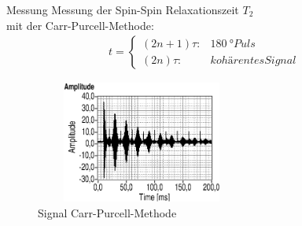\begin{frame}{Messung}
Messung der Spin-Spin Relaxationszeit $T_2$\\mit der Carr-Purcell-Methode:
	\begin{align*}
	t =\begin{cases*} (2n+1)\tau: & \SI{180}{\degree} Puls \\ (2n)\tau: & kohärentes Signal \end{cases*}
	\end{align*}
	\begin{figure}
	\centering
	\includegraphics[width=7cm, height=4cm]{images//sequenzcp.eps}
	\caption{Signal Carr-Purcell-Methode}
	\end{figure}
\end{frame}

